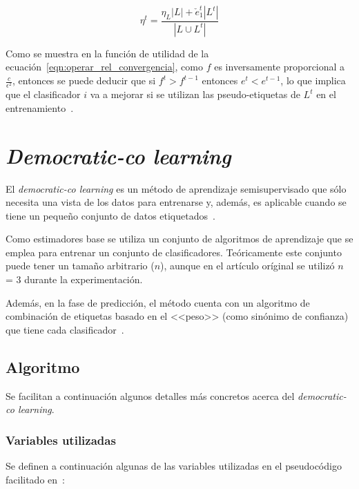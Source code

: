 \begin{equation}\label{eqn:ruido_it_tritraining} \eta^{t} = \frac{\eta_{L}|L| + \check{e}_{1}^{t}|L^{t}|}{|L \cup L^{t}|} \end{equation} 

Como se muestra en la función de utilidad de la ecuación~\ref{eqn:operar_rel_convergencia}, como $f$ es inversamente proporcional a  $\frac{c}{\epsilon^{2}}$, entonces se puede deducir que si $f^t > f^{t-1}$ entonces $e^t < e^{t-1}$, lo que implica que el clasificador $i$ va a mejorar si se utilizan las pseudo-etiquetas de $L^t$ en el entrenamiento~\cite{tritraining2005@original}.

\section{\textit{Democratic-co learning}}
\label{democraticco-teoria}

El \textit{democratic-co learning} es un método de aprendizaje semisupervisado que sólo necesita una vista de los datos para entrenarse y, además, es aplicable cuando se tiene un pequeño conjunto de datos etiquetados~\cite{democraticCoLearning2004original}.

Como estimadores base se utiliza un conjunto de algoritmos de aprendizaje que se emplea para entrenar un conjunto de clasificadores. Teóricamente este conjunto puede tener un tamaño arbitrario ($n$), aunque en el artículo oríginal se utilizó $n$ = 3 durante la experimentación.

Además, en la fase de predicción, el método cuenta con un algoritmo de combinación de etiquetas basado en el <<peso>> (como sinónimo de confianza) que tiene cada clasificador~\cite{democraticCoLearning2004original}.

\subsection{Algoritmo}

Se facilitan a continuación algunos detalles más concretos acerca del \textit{democratic-co learning}.

\subsubsection{Variables utilizadas}

Se definen a continuación algunas de las variables utilizadas en el pseudocódigo facilitado en~\cite{democraticCoLearning2004original}:

